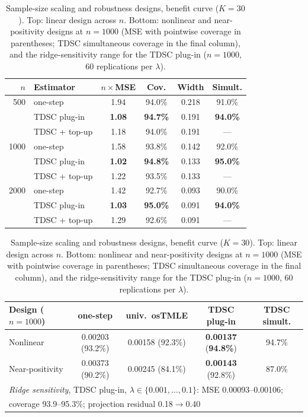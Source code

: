 \documentclass[11pt]{article}
\theoremstyle{remark}
\begin{document}
\begin{table}[t]
\centering\small
\caption{Sample-size scaling and robustness designs, benefit curve ($K=30$). Top: linear design across $n$. Bottom: nonlinear and near-positivity designs at $n=1000$ (MSE with pointwise coverage in parentheses; TDSC simultaneous coverage in the final column), and the ridge-sensitivity range for the TDSC plug-in ($n=1000$, 60 replications per $\lambda$).}
\label{tab:nscale}
\begin{tabular}{rlcccc}
\toprule
$n$ & Estimator & $n\times$MSE & Cov. & Width & Simult. \\
\midrule
 500 & one-step      & 1.94 & 94.0\% & 0.218 & 91.0\% \\
     & TDSC plug-in  & \textbf{1.08} & \textbf{94.7\%} & 0.191 & \textbf{94.0\%} \\
     & TDSC + top-up & 1.18 & 94.0\% & 0.191 & --- \\
1000 & one-step      & 1.58 & 93.8\% & 0.142 & 92.0\% \\
     & TDSC plug-in  & \textbf{1.02} & \textbf{94.8\%} & 0.133 & \textbf{95.0\%} \\
     & TDSC + top-up & 1.22 & 93.5\% & 0.133 & --- \\
2000 & one-step      & 1.42 & 92.7\% & 0.093 & 90.0\% \\
     & TDSC plug-in  & \textbf{1.03} & \textbf{95.0\%} & 0.091 & \textbf{94.0\%} \\
     & TDSC + top-up & 1.29 & 92.6\% & 0.091 & --- \\
\bottomrule
\end{tabular}

\medskip

\begin{tabular}{lcccc}
\toprule
Design ($n{=}1000$) & one-step & univ.\ osTMLE & TDSC plug-in & TDSC simult. \\
\midrule
Nonlinear       & 0.00203 (93.2\%) & 0.00158 (92.3\%) & \textbf{0.00137} (\textbf{94.8\%}) & 94.7\% \\
Near-positivity & 0.00373 (90.2\%) & 0.00245 (84.1\%) & \textbf{0.00143} (92.8\%) & 87.0\% \\
\midrule
\multicolumn{5}{l}{\emph{Ridge sensitivity}, TDSC plug-in, $\lambda\in\{0.001,\dots,0.1\}$: MSE 0.00093--0.00106;}\\
\multicolumn{5}{l}{\quad coverage 93.9--95.3\%; projection residual 0.18$\to$0.40}\\
\bottomrule
\end{tabular}
\end{table}
\end{document}
